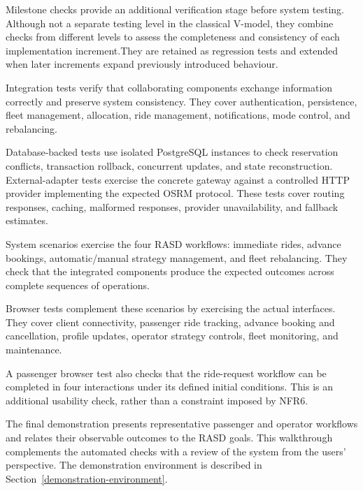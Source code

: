 \documentclass[11pt,a4paper,oneside]{report}
\begin{document}
\begin{description}
Milestone checks provide an additional verification stage before system
testing. Although not a separate testing level in the classical V-model,
they combine checks from different levels to assess the completeness
and consistency of each implementation increment.They are retained as regression tests and extended
    when later increments expand previously introduced behaviour.

    \item[\textbf{Integration testing.}]
    Integration tests verify that collaborating components exchange
    information correctly and preserve system consistency. They cover
    authentication, persistence, fleet management, allocation, ride
    management, notifications, mode control, and rebalancing.

    Database-backed tests use isolated PostgreSQL instances to check
    reservation conflicts, transaction rollback, concurrent updates,
    and state reconstruction. External-adapter tests exercise the
    concrete gateway against a controlled HTTP provider implementing
    the expected OSRM protocol. These tests cover routing responses,
    caching, malformed responses, provider unavailability, and fallback
    estimates.

    \item[\textbf{System scenarios and browser testing.}]
    System scenarios exercise the four RASD workflows: immediate
    rides, advance bookings, automatic/manual strategy management,
    and fleet rebalancing. They check that the integrated components
    produce the expected outcomes across complete sequences of
    operations.

    Browser tests complement these scenarios by exercising the actual
    interfaces. They cover client connectivity, passenger ride tracking,
    advance booking and cancellation, profile updates, operator
    strategy controls, fleet monitoring, and maintenance.

    A passenger browser test also checks that the ride-request
    workflow can be completed in four interactions under its defined
    initial conditions. This is an additional usability check,
    rather than a constraint imposed by NFR6.

    \item[\textbf{Acceptance walkthrough.}]
    The final demonstration presents representative passenger and
    operator workflows and relates their observable outcomes to the
    RASD goals. This walkthrough complements the automated checks
    with a review of the system from the users' perspective.
    The demonstration environment is described in
    Section~\ref{demonstration-environment}.

\end{description}
\end{document}
